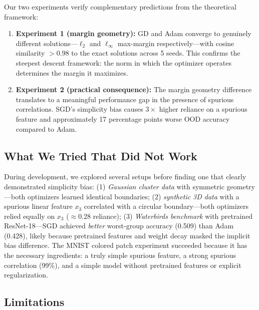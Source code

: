 \documentclass{article}
\begin{document}
Our two experiments verify complementary predictions from the theoretical framework:

\begin{enumerate}[leftmargin=*]
    \item \textbf{Experiment 1 (margin geometry):} GD and Adam converge to genuinely different solutions---$\ell_2$ and $\ell_\infty$ max-margin respectively---with cosine similarity $> 0.98$ to the exact solutions across 5 seeds. This confirms the steepest descent framework: the norm in which the optimizer operates determines the margin it maximizes.
    
    \item \textbf{Experiment 2 (practical consequence):} The margin geometry difference translates to a meaningful performance gap in the presence of spurious correlations. SGD's simplicity bias causes $3\times$ higher reliance on a spurious feature and approximately 17 percentage points worse OOD accuracy compared to Adam.
\end{enumerate}

\subsection{What We Tried That Did Not Work}

During development, we explored several setups before finding one that clearly demonstrated simplicity bias: (1) \emph{Gaussian cluster data} with symmetric geometry---both optimizers learned identical boundaries; (2) \emph{synthetic 3D data} with a spurious linear feature $x_3$ correlated with a circular boundary---both optimizers relied equally on $x_3$ ($\approx$0.28 reliance); (3) \emph{Waterbirds benchmark} with pretrained ResNet-18---SGD achieved \emph{better} worst-group accuracy (0.509) than Adam (0.428), likely because pretrained features and weight decay masked the implicit bias difference. The MNIST colored patch experiment succeeded because it has the necessary ingredients: a truly simple spurious feature, a strong spurious correlation (99\%), and a simple model without pretrained features or explicit regularization.

\subsection{Limitations}
\end{document}
